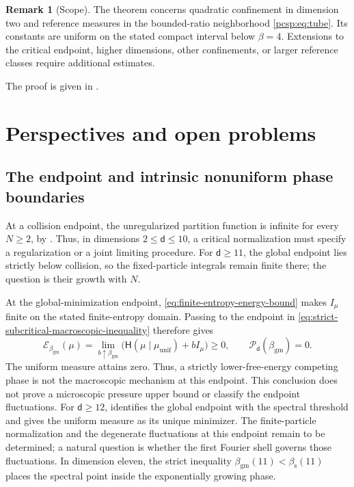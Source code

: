 \documentclass[11pt,reqno]{amsart}
\numberwithin{equation}{section}
\theoremstyle{plain}
\theoremstyle{definition}
\newtheorem{remark}[remark]{Remark}
\renewcommand{\d}{\mathsf d}
\newcommand{\be}{\beta}
\newcommand{\Hr}{\mathsf H}
\newcommand{\Ec}{\mathcal E}
\newcommand{\Pc}{\mathcal P}
\newcommand{\muunif}{\mu_{\mathrm{unif}}}
\newcommand{\gm}{\mathrm{gm}}
\newcommand{\spec}{\mathrm{s}}
\begin{document}
\begin{remark}[Scope]\label{pcsp:rem:scope}
The theorem concerns quadratic confinement in dimension two and reference measures in the bounded-ratio neighborhood \eqref{pcsp:eq:tube}. Its constants are uniform on the stated compact interval below $\be=4$. Extensions to the critical endpoint, higher dimensions, other confinements, or larger reference classes require additional estimates.
\end{remark}



The proof is given in .

\section{Perspectives and open problems}
\label{sec:perspectives}

\subsection{The endpoint and intrinsic nonuniform phase boundaries}

At a collision endpoint, the unregularized partition function is infinite for every $N\geq2$, by . Thus, in dimensions $2\leq\d\leq10$, a critical normalization must specify a regularization or a joint limiting procedure. For $\d\geq11$, the global endpoint lies strictly below collision, so the fixed-particle integrals remain finite there; the question is their growth with $N$.

At the global-minimization endpoint, \eqref{eq:finite-entropy-energy-bound} makes $I_\mu$ finite on the stated finite-entropy domain. Passing to the endpoint in \eqref{eq:strict-subcritical-macroscopic-inequality} therefore gives
\begin{equation}
 \Ec_{\beta_{\gm}}(\mu)
 =\lim_{b\uparrow\beta_{\gm}}\bigl(\Hr(\mu\mid\muunif)+bI_\mu\bigr)\geq0,
 \qquad \Pc_\d(\beta_{\gm})=0.
 \label{eq:global-endpoint-macroscopic-pressure}
\end{equation}
The uniform measure attains zero. Thus, a strictly lower-free-energy competing phase is not the macroscopic mechanism at this endpoint. This conclusion does not prove a microscopic pressure upper bound or classify the endpoint fluctuations. For $\d\geq12$,  identifies the global endpoint with the spectral threshold and gives the uniform measure as its unique minimizer. The finite-particle normalization and the degenerate fluctuations at this endpoint remain to be determined; a natural question is whether the first Fourier shell governs those fluctuations. In dimension eleven, the strict inequality $\beta_{\gm}(11)<\beta_{\spec}(11)$ places the spectral point inside the exponentially growing phase.
\end{document}
